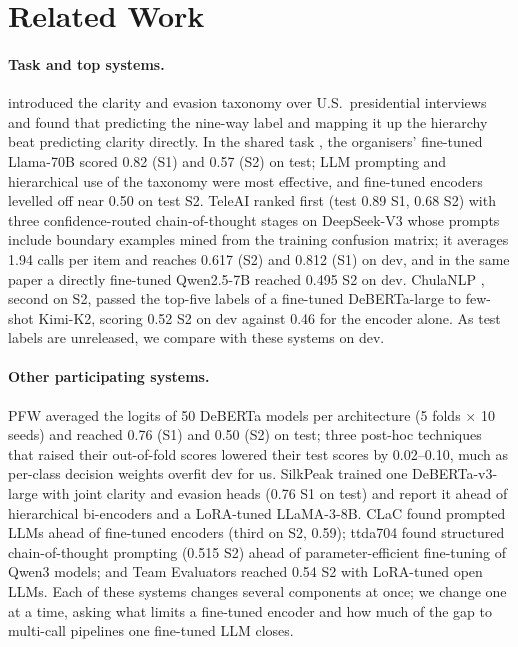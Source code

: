 \section{Related Work}\label{sec:related}

\paragraph{Task and top systems.}
\citet{thomas-etal-2024-never} introduced the clarity and evasion taxonomy over U.S.\ presidential interviews and found that predicting the nine-way label and mapping it up the hierarchy beat predicting clarity directly.
In the shared task \citep{thomas-etal-2026-semeval}, the organisers' fine-tuned Llama-70B scored 0.82 (S1) and 0.57 (S2) on test; LLM prompting and hierarchical use of the taxonomy were most effective, and fine-tuned encoders levelled off near 0.50 on test S2.
TeleAI \citep{shi-etal-2026-teleai} ranked first (test 0.89 S1, 0.68 S2) with three confidence-routed chain-of-thought stages on DeepSeek-V3 whose prompts include boundary examples mined from the training confusion matrix; it averages 1.94 calls per item and reaches 0.617 (S2) and 0.812 (S1) on dev, and in the same paper a directly fine-tuned Qwen2.5-7B reached 0.495 S2 on dev.
ChulaNLP \citep{peerachaidecho-rutherford-2026-chulanlp}, second on S2, passed the top-five labels of a fine-tuned DeBERTa-large to few-shot Kimi-K2, scoring 0.52 S2 on dev against 0.46 for the encoder alone.
As test labels are unreleased, we compare with these systems on dev.

\paragraph{Other participating systems.}
PFW \citep{tamsal-rusert-2026-pfw} averaged the logits of 50 DeBERTa models per architecture (5 folds $\times$ 10 seeds) and reached 0.76 (S1) and 0.50 (S2) on test; three post-hoc techniques that raised their out-of-fold scores lowered their test scores by 0.02--0.10, much as per-class decision weights overfit dev for us.
SilkPeak \citep{tetakali-tetakali-2026-silkpeak} trained one DeBERTa-v3-large with joint clarity and evasion heads (0.76 S1 on test) and report it ahead of hierarchical bi-encoders and a LoRA-tuned LLaMA-3-8B.
CLaC \citep{turk-etal-2026-clac} found prompted LLMs ahead of fine-tuned encoders (third on S2, 0.59); ttda704 \citep{tran-tan-dinh-2026-ttda704} found structured chain-of-thought prompting (0.515 S2) ahead of parameter-efficient fine-tuning of Qwen3 models; and Team Evaluators \citep{nuthakki-etal-2026-team} reached 0.54 S2 with LoRA-tuned open LLMs.
Each of these systems changes several components at once; we change one at a time, asking what limits a fine-tuned encoder and how much of the gap to multi-call pipelines one fine-tuned LLM closes.

